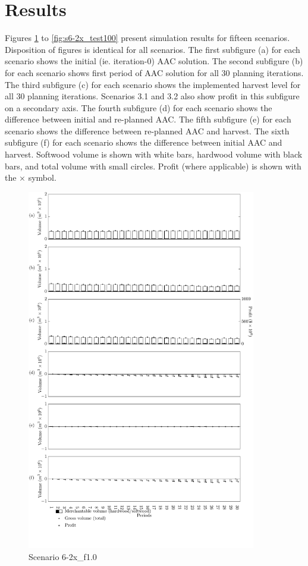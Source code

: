 \section{Results}

Figures \ref{fig:s6-2x_test00} to \ref{fig:s6-2x_test100} present
simulation results for fifteen scenarios. %
Disposition of figures is identical for all scenarios. The
first subfigure (a) for each scenario shows the initial
(ie. iteration-0) AAC solution. The second subfigure (b) for each
scenario shows first period of AAC solution for all 30 planning
iterations. The third subfigure (c) for each scenario shows the
implemented harvest level for all 30 planning iterations. Scenarios
3.1 and 3.2 also show profit in this subfigure on a secondary
axis. The fourth subfigure (d) for each scenario shows the difference
between initial and re-planned AAC. The fifth subfigure (e) for each
scenario shows the difference between re-planned AAC and harvest.  The
sixth subfigure (f) for each scenario shows the difference between
initial AAC and harvest. Softwood volume is shown with white bars,
hardwood volume with black bars, and total volume with small
circles. Profit (where applicable) is shown with the $\times$
symbol. 


\begin{figure}[h]
  \centering
  \includegraphics[width=10cm]{images/appendix/s6-2x_test00}
  \caption{Scenario 6-2x\_f1.0}
  \label{fig:s6-2x_test00}
\end{figure}

